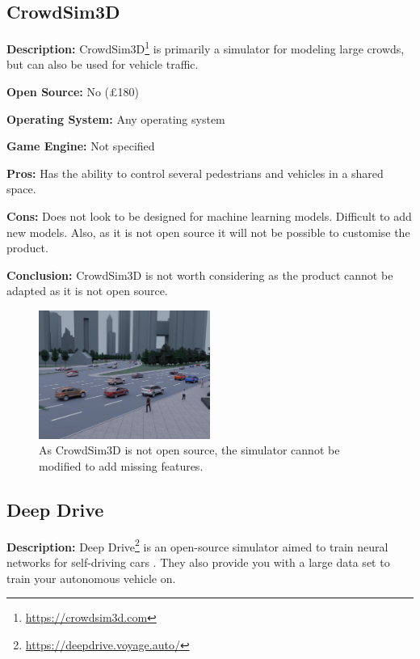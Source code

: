 \subsection{CrowdSim3D}
\textbf{Description:} CrowdSim3D\footnote{\url{https://crowdsim3d.com}} is primarily a simulator for modeling large crowds, but can also be used for vehicle traffic. 

\textbf{Open Source:} No (£180)

\textbf{Operating System:} Any operating system

\textbf{Game Engine:} Not specified

\textbf{Pros:} Has the ability to control several pedestrians and vehicles in a shared space.

\textbf{Cons:} Does not look to be designed for machine learning models. Difficult to add new models. Also, as it is not open source it will not be possible to customise the product. 

\textbf{Conclusion:} CrowdSim3D is not worth considering as the product cannot be adapted as it is not open source. 

\begin{figure}[H]
    \centering
    \includegraphics[width=0.5\textwidth]{03_Background/Appendix/Simulators/CrowdSim.JPG}
    \caption[CrowdSim3D]{As CrowdSim3D is not open source, the simulator cannot be modified to add missing features.}
\end{figure}


\subsection{Deep Drive}
\textbf{Description:} Deep Drive\footnote{\url{https://deepdrive.voyage.auto/}} is an open-source simulator aimed to train neural networks for self-driving cars \cite{DeepDrive_Website}. They also provide you with a large data set to train your autonomous vehicle on. 


